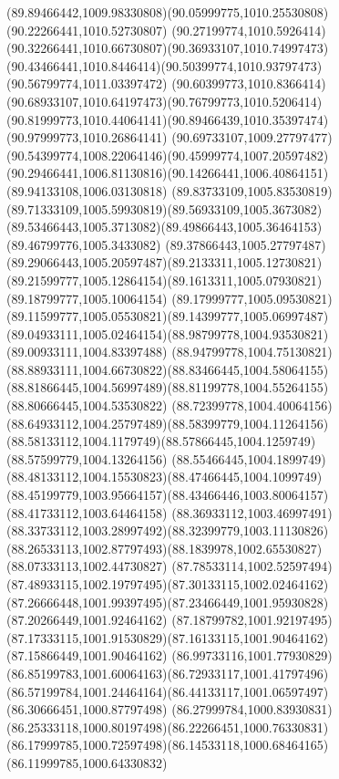 {    \curveto(89.89466442,1009.98330808)(90.05999775,1010.25530808)(90.22266441,1010.52730807)
    \curveto(90.27199774,1010.5926414)(90.32266441,1010.66730807)(90.36933107,1010.74997473)
    \curveto(90.43466441,1010.8446414)(90.50399774,1010.93797473)(90.56799774,1011.03397472)
    \curveto(90.60399773,1010.8366414)(90.68933107,1010.64197473)(90.76799773,1010.5206414)
    \curveto(90.81999773,1010.44064141)(90.89466439,1010.35397474)(90.97999773,1010.26864141)
    \curveto(90.69733107,1009.27797477)(90.54399774,1008.22064146)(90.45999774,1007.20597482)
    \curveto(90.29466441,1006.81130816)(90.14266441,1006.40864151)(89.94133108,1006.03130818)
    \curveto(89.83733109,1005.83530819)(89.71333109,1005.59930819)(89.56933109,1005.3673082)
    \curveto(89.53466443,1005.3713082)(89.49866443,1005.36464153)(89.46799776,1005.3433082)
    \curveto(89.37866443,1005.27797487)(89.29066443,1005.20597487)(89.2133311,1005.12730821)
    \curveto(89.21599777,1005.12864154)(89.1613311,1005.07930821)(89.18799777,1005.10064154)
    \curveto(89.17999777,1005.09530821)(89.11599777,1005.05530821)(89.14399777,1005.06997487)
    \curveto(89.04933111,1005.02464154)(88.98799778,1004.93530821)(89.00933111,1004.83397488)
    \curveto(88.94799778,1004.75130821)(88.88933111,1004.66730822)(88.83466445,1004.58064155)
    \curveto(88.81866445,1004.56997489)(88.81199778,1004.55264155)(88.80666445,1004.53530822)
    \curveto(88.72399778,1004.40064156)(88.64933112,1004.25797489)(88.58399779,1004.11264156)
    \curveto(88.58133112,1004.1179749)(88.57866445,1004.1259749)(88.57599779,1004.13264156)
    \curveto(88.55466445,1004.1899749)(88.48133112,1004.15530823)(88.47466445,1004.1099749)
    \curveto(88.45199779,1003.95664157)(88.43466446,1003.80064157)(88.41733112,1003.64464158)
    \curveto(88.36933112,1003.46997491)(88.33733112,1003.28997492)(88.32399779,1003.11130826)
    \curveto(88.26533113,1002.87797493)(88.1839978,1002.65530827)(88.07333113,1002.44730827)
    \curveto(87.78533114,1002.52597494)(87.48933115,1002.19797495)(87.30133115,1002.02464162)
    \curveto(87.26666448,1001.99397495)(87.23466449,1001.95930828)(87.20266449,1001.92464162)
    \curveto(87.18799782,1001.92197495)(87.17333115,1001.91530829)(87.16133115,1001.90464162)
    \lineto(87.15866449,1001.90464162)
    \curveto(86.99733116,1001.77930829)(86.85199783,1001.60064163)(86.72933117,1001.41797496)
    \curveto(86.57199784,1001.24464164)(86.44133117,1001.06597497)(86.30666451,1000.87797498)
    \curveto(86.27999784,1000.83930831)(86.25333118,1000.80197498)(86.22266451,1000.76330831)
    \curveto(86.17999785,1000.72597498)(86.14533118,1000.68464165)(86.11999785,1000.64330832)
}
